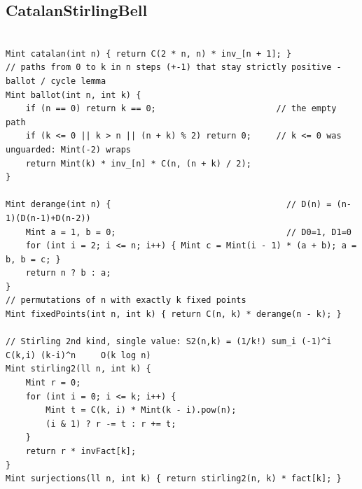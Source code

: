 \documentclass[9pt,a4paper,twocolumn]{extarticle}
\begin{document}
\subsection{CatalanStirlingBell}
\nopagebreak
\begin{lstlisting}

Mint catalan(int n) { return C(2 * n, n) * inv_[n + 1]; }
// paths from 0 to k in n steps (+-1) that stay strictly positive - ballot / cycle lemma
Mint ballot(int n, int k) {
    if (n == 0) return k == 0;                        // the empty path
    if (k <= 0 || k > n || (n + k) % 2) return 0;     // k <= 0 was unguarded: Mint(-2) wraps
    return Mint(k) * inv_[n] * C(n, (n + k) / 2);
}

Mint derange(int n) {                                   // D(n) = (n-1)(D(n-1)+D(n-2))
    Mint a = 1, b = 0;                                  // D0=1, D1=0
    for (int i = 2; i <= n; i++) { Mint c = Mint(i - 1) * (a + b); a = b, b = c; }
    return n ? b : a;
}
// permutations of n with exactly k fixed points
Mint fixedPoints(int n, int k) { return C(n, k) * derange(n - k); }

// Stirling 2nd kind, single value: S2(n,k) = (1/k!) sum_i (-1)^i C(k,i) (k-i)^n     O(k log n)
Mint stirling2(ll n, int k) {
    Mint r = 0;
    for (int i = 0; i <= k; i++) {
        Mint t = C(k, i) * Mint(k - i).pow(n);
        (i & 1) ? r -= t : r += t;
    }
    return r * invFact[k];
}
Mint surjections(ll n, int k) { return stirling2(n, k) * fact[k]; }


\end{lstlisting}
\end{document}
